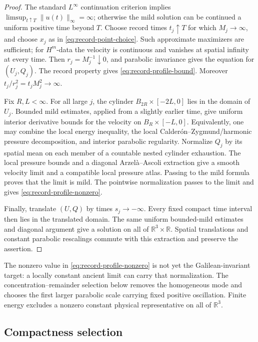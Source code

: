 \documentclass[11pt]{amsart}
\numberwithin{equation}{section}
\theoremstyle{plain}
\theoremstyle{definition}
\theoremstyle{remark}
\newcommand{\R}{\mathbb R}
\begin{document}
\begin{proof}
The standard \(L^\infty\) continuation criterion implies
\(\limsup_{t\uparrow T}\|u(t)\|_\infty=\infty\); otherwise the mild
solution can be continued a uniform positive time beyond \(T\).  Choose
record times \(t_j\uparrow T\) for which \(M_j\to\infty\), and choose
\(x_j\) as in \eqref{eq:record-point-choice}.  Such approximate maximizers
are sufficient; for \(H^m\)-data the velocity is continuous and vanishes at
spatial infinity at every time.  Then \(r_j=M_j^{-1}\downarrow0\), and
parabolic invariance gives the equation for \((U_j,Q_j)\).  The record
property gives \eqref{eq:record-profile-bound}.  Moreover
\(t_j/r_j^2=t_jM_j^2\to\infty\).

Fix \(R,L<\infty\).  For all large \(j\), the cylinder
\(B_{2R}\times[-2L,0]\) lies in the domain of \(U_j\).  Bounded mild
estimates, applied from a slightly earlier time, give uniform interior
derivative bounds for the velocity on \(B_R\times[-L,0]\).  Equivalently,
one may combine the local energy inequality, the local
Calder\'on--Zygmund/harmonic pressure decomposition, and interior parabolic
regularity.  Normalize \(Q_j\) by its spatial mean on each member of a
countable nested cylinder exhaustion.  The local pressure bounds and a
diagonal Arzel\`a--Ascoli extraction give a smooth velocity limit and a
compatible local pressure atlas.  Passing to the mild formula proves that the
limit is mild.  The pointwise normalization passes to the limit and gives
\eqref{eq:record-profile-nonzero}.

Finally, translate \((U,Q)\) by times \(s_j\to-\infty\).  Every fixed
compact time interval then lies in the translated domain.  The same uniform
bounded-mild estimates and diagonal argument give a solution on all of
\(\R^3\times\R\).  Spatial translations and constant parabolic rescalings
commute with this extraction and preserve the assertion.
\end{proof}

The nonzero value in \eqref{eq:record-profile-nonzero} is not yet the
Galilean-invariant target: a locally constant ancient limit can carry that
normalization.  The concentration--remainder selection below removes the
homogeneous mode and chooses the first larger parabolic scale carrying fixed
positive oscillation.  Finite energy excludes a nonzero constant physical
representative on all of \(\R^3\).

\subsection{Compactness selection}
\label{app:compactness-selection}
\end{document}

